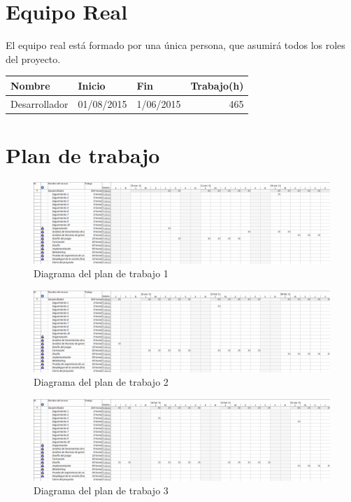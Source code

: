 \FloatBarrier

\section{Equipo Real}

El equipo real está formado por una única persona, que asumirá todos los roles del proyecto.

\begin{center}
	\begin{tabular}{|l|l|l|r|}
		\hline
		Nombre & Inicio & Fin & Trabajo(h) \\ \hline
		Desarrollador & 01/08/2015 & 1/06/2015 & 465 \\
		\hline
	\end{tabular}
\end{center}

\clearpage

\section{Plan de trabajo}

\begin{figure}[!htp]
	\centering
	\includegraphics[page=1, scale=.5, angle=90]{fig/Plan1}
	\caption{Diagrama del plan de trabajo 1}
\end{figure}

\begin{figure}[!htp]
	\centering
	\includegraphics[page=2, scale=.5, angle=90]{fig/Plan2}
	\caption{Diagrama del plan de trabajo 2}
\end{figure}

\begin{figure}[!htp]
	\centering
	\includegraphics[page=3, scale=.5, angle=90]{fig/Plan3}
	\caption{Diagrama del plan de trabajo 3}
\end{figure}

